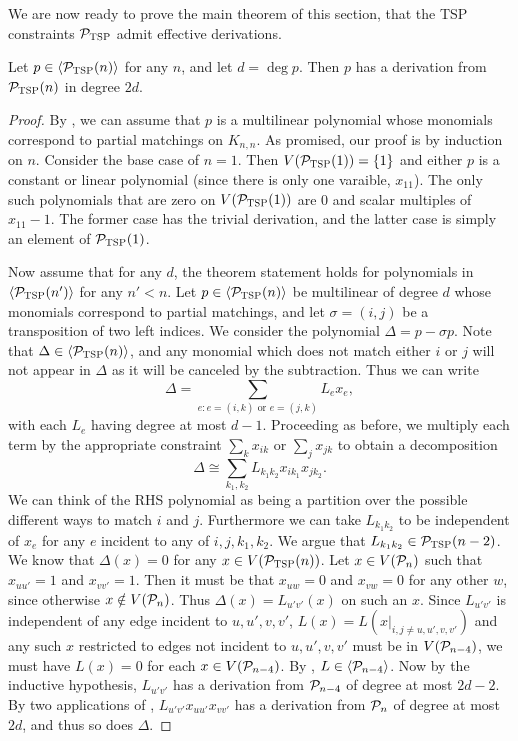 We are now ready to prove the main theorem of this section, that the \textsc{TSP} constraints $\mathcal P_{\textsc{TSP}}$ admit effective derivations. 
\begin{theorem}\label{thm:tsp-effective}
Let $p \in \langle \mathcal P_{\textsc{TSP}}(n) \rangle$ for any $n$, and let $d = \deg p$. Then $p$ has a derivation from $\mathcal P_{\textsc{TSP}}(n)$ in degree $2d$. 
\end{theorem}
\begin{proof}
By , we can assume that $p$ is a multilinear polynomial whose monomials correspond to partial matchings on $K_{n,n}$.
As promised, our proof is by induction on $n$. Consider the base case of $n = 1$. 
Then $V(\mathcal P_{\textsc{TSP}}(1)) = \{1\}$ and either $p$ is a constant or linear polynomial (since there is only one varaible, $x_{11}$).
The only such polynomials that are zero on $V(\mathcal P_{\textsc{TSP}}(1))$ are $0$ and scalar multiples of $x_{11} - 1$. 
The former case has the trivial derivation, and the latter case is simply an element of $\mathcal P_{\textsc{TSP}}(1)$. 

Now assume that for any $d$, the theorem statement holds for polynomials in $\langle \mathcal P_{\textsc{TSP}}(n') \rangle$ for any $n' < n$. 
Let $p \in \langle \mathcal P_{\textsc{TSP}}(n) \rangle$ be multilinear of degree $d$ whose monomials correspond to partial matchings, and let $\sigma = (i,j)$ be a transposition of two left indices.
We consider the polynomial $\Delta = p - \sigma p$. Note that $\Delta \in \langle \mathcal P_{\textsc{TSP}}(n) \rangle$, and any monomial which does not match either $i$ or $j$ will not appear in $\Delta$ as it will be canceled by the subtraction.
Thus we can write
\[\Delta = \sum_{e: e = (i,k) \text{ or } e = (j,k)} L_e x_e,\]
with each $L_e$ having degree at most $d-1$. Proceeding as before, we multiply each term by the appropriate constraint $\sum_k x_{ik}$ or $\sum_j x_{jk}$ to obtain a decomposition
\[\Delta \cong \sum_{k_1,k_2} L_{k_1k_2} x_{ik_1}x_{jk_2}.\]
We can think of the RHS polynomial as being a partition over the possible different ways to match $i$ and $j$.
Furthermore we can take $L_{k_1k_2}$ to be independent of $x_e$ for any $e$ incident to any of $i,j,k_1,k_2$. 
We argue that $L_{k_1k_2} \in \mathcal P_{\textsc{TSP}}(n-2)$. We know that $\Delta(x) = 0$ for any $x \in V(\mathcal P_{\textsc{TSP}}(n))$. Let $x \in V(\mathcal P_n)$ such that $x_{uu'} = 1$ and $x_{vv'} = 1$. 
Then it must be that $x_{uw} = 0$ and $x_{vw} = 0$ for any other $w$, since otherwise $x \notin V(\mathcal P_n)$.
Thus $\Delta(x) = L_{u'v'}(x)$ on such an $x$. Since $L_{u'v'}$ is independent of any edge incident to $u,u',v,v'$, $L(x) = L(x|_{i,j \neq u,u',v,v'})$ and any such $x$ restricted to edges not incident to $u,u',v,v'$ must be in $V(\mathcal P_{n-4})$, we must have $L(x) = 0$ for each $x \in V(\mathcal P_{n-4})$. By , $L \in \langle \mathcal P_{n-4} \rangle$. Now by the inductive hypothesis, $L_{u'v'}$ has a derivation from $\mathcal P_{n-4}$ of degree at most $2d-2$. By two applications of , $L_{u'v'}x_{uu'}x_{vv'}$ has a derivation from $\mathcal P_n$ of degree at most $2d$, and thus so does $\Delta$.


\end{proof}

